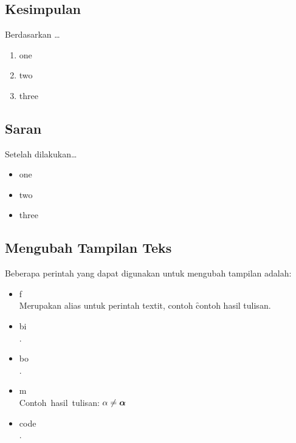 \chapter{\babLima}


\section{Kesimpulan}
Berdasarkan \dots

\begin{enumerate}
	\item one
	\item two
	\item three
\end{enumerate}

\section{Saran}
Setelah dilakukan\dots

\begin{itemize}
	\item one
	\item two
	\item three
\end{itemize}

\iffalse
	\section{Mengubah Tampilan Teks}
	Beberapa perintah yang dapat digunakan untuk mengubah tampilan adalah:
	\begin{itemize}
		\item \bslash f \\
		      Merupakan alias untuk perintah \bslash textit, contoh
		      \f{contoh hasil tulisan}.
		\item \bslash bi \\
		      .
		\item \bslash bo \\
		      .
		\item \bslash m \\
		      Contoh\ hasil\ tulisan: $\alpha \not= \bm{\alpha}$
		\item \bslash code \\
		      .
	\end{itemize}


